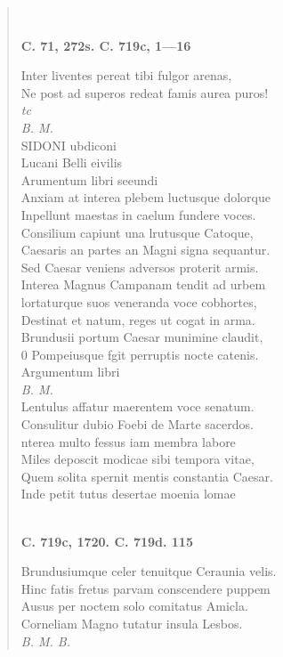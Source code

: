 \documentclass[11pt, a4paper]{report}
\begin{document}
\begin{verse}
        ﻿\pagebreak 
     \marginpar{[195]} \begin{center} \textbf{C. 71, 272s. C. 719c, 1—16} \end{center}Inter liventes pereat tibi fulgor arenas, \\ Ne post ad superos redeat famis aurea puros! \\ \textit{tc} \\ \textit{B. M.} \\ SIDONI ubdiconi \\  \lbrack Lucani Belli eivilis \rbrack  \\ Arumentum libri seeundi \\ Anxiam  \lbrack at \rbrack  interea plebem luctusque dolorque \\ Inpellunt maestas in caelum fundere voces. \\ Consilium capiunt una lrutusque Catoque, \\ Caesaris an partes an Magni signa sequantur. \\ Sed Caesar veniens adversos proterit armis. \\ Interea Magnus Campanam tendit ad urbem \\ lortaturque suos veneranda voce cobhortes, \\ Destinat et natum, reges ut cogat in arma. \\ Brundusii portum Caesar munimine claudit, \\ 0 Pompeiusque fgit perruptis nocte catenis. \\ Argumentum libri \\ \textit{B. M.} \\ Lentulus affatur maerentem voce senatum. \\ Consulitur dubio Foebi de Marte sacerdos. \\ nterea multo fessus iam membra labore \\ Miles deposcit modicae sibi tempora vitae, \\ Quem solita spernit mentis constantia Caesar. \\ Inde petit tutus desertae moenia lomae \\ 
        ﻿\pagebreak 
    \begin{center} \textbf{C. 719c, 1720. C. 719d. 115} \end{center} \marginpar{[196]} Brundusiumque celer tenuitque Ceraunia velis. \\ Hinc fatis fretus parvam conscendere puppem \\ Ausus per noctem solo comitatus Amicla. \\ Corneliam Magno tutatur insula Lesbos. \\ \textit{B. M. B.} \\ 
      \end{verse}
  
\end{document}
